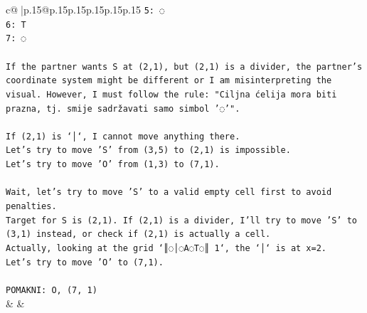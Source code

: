 \documentclass{article}
\begin{document}
{\begin{supertabular}{c@{$\;$}|p{.15\linewidth}@{}p{.15\linewidth}p{.15\linewidth}p{.15\linewidth}p{.15\linewidth}p{.15\linewidth}}
{{{\texttt{5: ◌} \\
\texttt{6: T} \\
\texttt{7: ◌} \\
\\ 
\texttt{If the partner wants S at (2,1), but (2,1) is a divider, the partner's coordinate system might be different or I am misinterpreting the visual. However, I must follow the rule: "Ciljna ćelija mora biti prazna, tj. smije sadržavati samo simbol '◌'".} \\
\\ 
\texttt{If (2,1) is `│`, I cannot move anything there.} \\
\texttt{Let's try to move 'S' from (3,5) to (2,1) is impossible.} \\
\texttt{Let's try to move 'O' from (1,3) to (7,1).} \\
\\ 
\texttt{Wait, let's try to move 'S' to a valid empty cell first to avoid penalties.} \\
\texttt{Target for S is (2,1). If (2,1) is a divider, I'll try to move 'S' to (3,1) instead, or check if (2,1) is actually a cell.} \\
\texttt{Actually, looking at the grid `║◌│◌A◌T◌║ 1`, the `│` is at x=2.} \\
\texttt{Let's try to move 'O' to (7,1).} \\
\\ 
\texttt{POMAKNI: O, (7, 1)} \\
            }
        }
    }
    & & \\ \\


\end{supertabular}}
\end{document}
